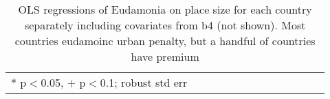 \documentclass[10pt, letterpaper]{article}
\begin{document}
\begin{spacing}{1.4}
\begin{spacing}{.9} \begin{table}[H]\centering   \begin{scriptsize} \begin{tabular}{p{.5in}p{.5in}p{.5in}p{.5in}p{.5in}p{.5in}p{.5in}p{.5in}p{.5in}p{.5in}p{.5
                                                                      in}p{.5in}p{.5
                                                                      in}}\hline
                                                                      
                                                                      \hline *
                                                                      p$<$0.05,
                                                                      $+$
                                                                      p$<$0.1;
                                                                      robust std
                                                                      err \end{tabular}\end{scriptsize}\caption{\label{b4cou}OLS
                                                                    regressions
                                                                    of Eudamonia on
                                                                    place size
                                                                    for each
                                                                    country
                                                                    separately
                                                                    including
                                                                    covariates
                                                                    from b4 (not
                                                                    shown). Most
                                                                    countries
                                                                    eudamoinc
                                                                    urban
                                                                    penalty, but
                                                                    a
                                                                    handful of
                                                                    countries
                                                                    have premium
                                                           }\end{table} \end{spacing}




\end{spacing}
\end{document}
